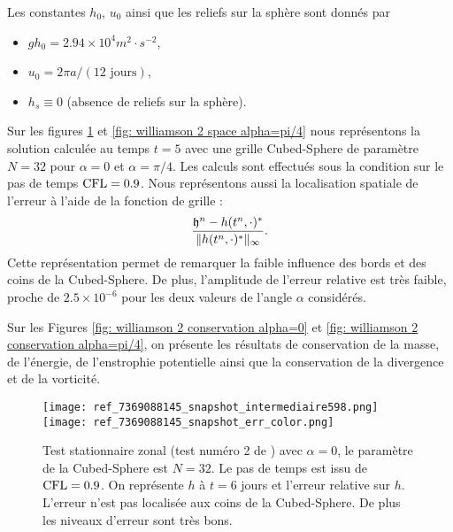 Les constantes $h_0$, $u_0$ ainsi que les reliefs sur la sphère sont donnés par 
\begin{itemize}
\item $g h_0= 2.94 \times 10^4 m^2 \cdot \si{s^{-2}}$,
\item $u_0= 2 \pi a / (12 \text{ jours})$,
\item $h_s \equiv 0$ (absence de reliefs sur la sphère).
\end{itemize}

Sur les figures \ref{fig: williamson 2 space alpha=0} et \ref{fig: williamson 2 space alpha=pi/4} nous représentons la solution calculée au temps $t=5$ avec une grille Cubed-Sphere de paramètre $N=32$ pour $\alpha= 0$ et $\alpha= \pi/4$. Les calculs sont effectués sous la condition sur le pas de temps $\text{CFL}=0.9$. Nous représentons aussi la localisation spatiale de l'erreur à l'aide de la fonction de grille :
\begin{equation}
\dfrac{\mathfrak{h}^n - h(t^n, \cdot)^*}{\| h(t^n, \cdot)^* \|_{\infty}}.
\end{equation}
Cette représentation permet de remarquer la faible influence des bords et des coins de la Cubed-Sphere. De plus, l'amplitude de l'erreur relative est très faible, proche de $2.5 \times 10^{-6}$ pour les deux valeurs de l'angle $\alpha$ considérés.
 
Sur les Figures \ref{fig: williamson 2 conservation alpha=0} et \ref{fig: williamson 2 conservation alpha=pi/4}, on présente les résultats de conservation de la masse, de l'énergie, de l'enstrophie potentielle ainsi que la conservation de la divergence et de la vorticité.

\begin{figure}[htbp]
\begin{center}
\texttt{[image: ref\_7369088145\_snapshot\_intermediaire598.png]}\\
\texttt{[image: ref\_7369088145\_snapshot\_err\_color.png]}
\end{center}
\caption{Test stationnaire zonal (test numéro 2 de \cite{Williamson1992}) avec $\alpha=0$, le paramètre de la Cubed-Sphere est $N=32$. Le pas de temps est issu de $\text{CFL}=0.9$. On représente $h$ à $t=6$ jours et l'erreur relative sur $h$. L'erreur n'est pas localisée aux coins de la Cubed-Sphere. De plus les niveaux d'erreur sont très bons.}
\label{fig: williamson 2 space alpha=0}
\end{figure}


